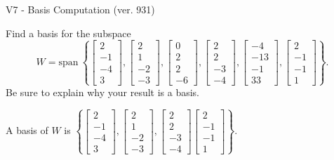 \begin{exercise}
  \begin{exerciseTitle}V7 - Basis Computation (ver. 931)\end{exerciseTitle}
  \begin{exerciseStatement}
    Find a basis for the subspace 
\[W=\mathrm{span}\ \left\{\left[\begin{array}{r}
2 \\
-1 \\
-4 \\
3
\end{array}\right] , \left[\begin{array}{r}
2 \\
1 \\
-2 \\
-3
\end{array}\right] , \left[\begin{array}{r}
0 \\
2 \\
2 \\
-6
\end{array}\right] , \left[\begin{array}{r}
2 \\
2 \\
-3 \\
-4
\end{array}\right] , \left[\begin{array}{r}
-4 \\
-13 \\
-1 \\
33
\end{array}\right] , \left[\begin{array}{r}
2 \\
-1 \\
-1 \\
1
\end{array}\right]\right\}.\]
 Be sure to explain why your result is a basis.


  \end{exerciseStatement}
  \begin{exerciseAnswer}
   A basis of \(W\) is  \(\left\{\left[\begin{array}{r}
2 \\
-1 \\
-4 \\
3
\end{array}\right] , \left[\begin{array}{r}
2 \\
1 \\
-2 \\
-3
\end{array}\right] , \left[\begin{array}{r}
2 \\
2 \\
-3 \\
-4
\end{array}\right] \left[\begin{array}{r}
2 \\
-1 \\
-1 \\
1
\end{array}\right]\right\}\).
  


  \end{exerciseAnswer}
\end{exercise}